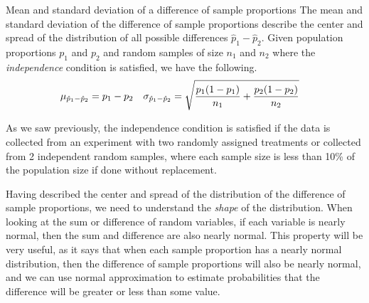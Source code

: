 \begin{onebox}{Mean and standard deviation of a difference of sample proportions}
The mean and standard deviation of the difference of sample proportions describe the center and spread of the distribution of all possible differences $\hat{p}_1-\hat{p}_2$.  Given population proportions $p_1$ and $p_2$ and random samples of size $n_1$ and $n_2$ where the \emph{independence} condition is satisfied, we have the following.
\begin{align*}
\mu_{\hat{p}_1-\hat{p}_2} &= p_1-p_2
	& \sigma_{\hat{p}_1-\hat{p}_2}&=  \sqrt{\frac{p_1(1-p_1)}{n_1} + \frac{p_2(1-p_2)}{n_2}}
	\vspace{1mm}
\end{align*}\end{onebox}

As we saw previously, the independence condition is satisfied if the data is collected from an experiment with two randomly assigned treatments or collected from 2 independent random samples, where each sample size is less than 10\% of the population size if done without replacement.

Having described the center and spread of the distribution of the difference of sample proportions, we need to understand the \emph{shape} of the distribution.  When looking at the sum or difference of random variables, if each variable is nearly normal, then the sum and difference are also nearly normal.  This property will be very useful, as it says that when each sample proportion has a nearly normal distribution, then the difference of sample proportions will also be nearly normal, and we can use normal approximation to estimate probabilities that the difference will be greater or less than some value.

